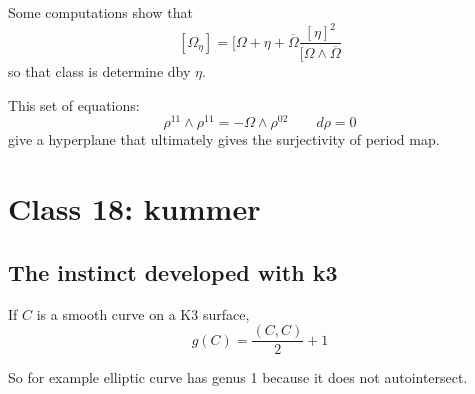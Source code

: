 	\begin{remark}\leavevmode
		Some computations show that
		\[ [\Omega_\eta]=[\Omega+\eta+\overline{\Omega}\frac{[\eta]^2}{[\Omega\wedge \overline{\Omega}}\]
		so that class is determine dby $\eta$.
	\end{remark}

	\begin{remark}\leavevmode
		This set of equations:
		\[\rho^{11}\wedge \rho^{11}=-\Omega\wedge \rho^{02}\qquad d\rho=0\]
		give a hyperplane that ultimately gives the surjectivity of period map.
	\end{remark}

\section{Class 18: kummer}

\subsection{The instinct developed with k3}

\begin{coro}\leavevmode
	If  $C$ is a smooth curve on a K3 surface,
	\[g(C)=\frac{(C,C)}{2}+1\]
\end{coro}

So for example elliptic curve has genus 1 because it does not autointersect. 








